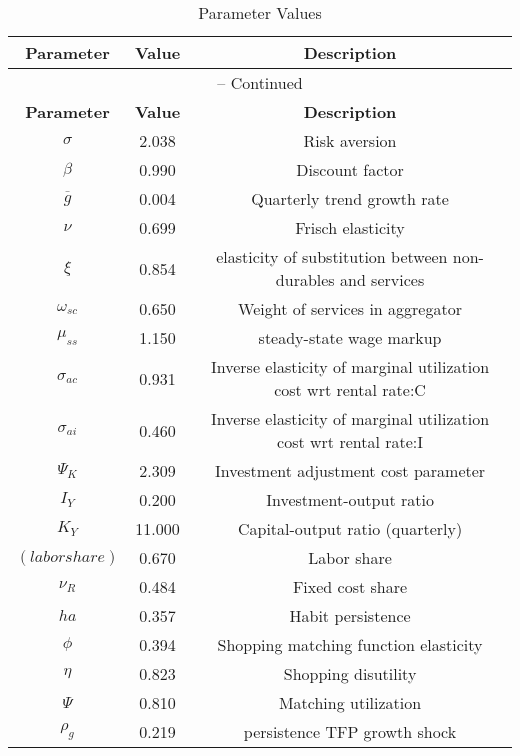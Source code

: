 \begin{center}
\begin{longtable}{ccc}
\caption{Parameter Values}\\%
\toprule%
\multicolumn{1}{c}{\textbf{Parameter}} &
\multicolumn{1}{c}{\textbf{Value}} &
 \multicolumn{1}{c}{\textbf{Description}}\\%
\midrule%
\endfirsthead
\multicolumn{3}{c}{{\tablename} \thetable{} -- Continued}\\%
\midrule%
\multicolumn{1}{c}{\textbf{Parameter}} &
\multicolumn{1}{c}{\textbf{Value}} &
  \multicolumn{1}{c}{\textbf{Description}}\\%
\midrule%
\endhead
${\sigma}$ 	 & 	 2.038 	 & 	 Risk aversion\\
${\beta}$ 	 & 	 0.990 	 & 	 Discount factor\\
${\overline{g}}$ 	 & 	 0.004 	 & 	 Quarterly trend growth rate\\
$\nu$ 	 & 	 0.699 	 & 	 Frisch elasticity\\
$\xi$ 	 & 	 0.854 	 & 	 elasticity of substitution between non-durables and services\\
$\omega_{sc}$ 	 & 	 0.650 	 & 	 Weight of services in aggregator\\
$\mu_{ss}$ 	 & 	 1.150 	 & 	 steady-state wage markup\\
${\sigma_{ac}}$ 	 & 	 0.931 	 & 	 Inverse elasticity of marginal utilization cost wrt rental rate:C\\
${\sigma_{ai}}$ 	 & 	 0.460 	 & 	 Inverse elasticity of marginal utilization cost wrt rental rate:I\\
${\Psi_{K}}$ 	 & 	 2.309 	 & 	 Investment adjustment cost parameter\\
${I_Y}$ 	 & 	 0.200 	 & 	 Investment-output ratio\\
${K_Y}$ 	 & 	 11.000 	 & 	 Capital-output ratio (quarterly)\\
$(labor share)$ 	 & 	 0.670 	 & 	 Labor share\\
${\nu_R}$ 	 & 	 0.484 	 & 	 Fixed cost share\\
${ha}$ 	 & 	 0.357 	 & 	 Habit persistence\\
${\phi}$ 	 & 	 0.394 	 & 	 Shopping matching function elasticity\\
${\eta}$ 	 & 	 0.823 	 & 	 Shopping disutility\\
${\Psi}$ 	 & 	 0.810 	 & 	 Matching utilization\\
${\rho_g}$ 	 & 	 0.219 	 & 	 persistence TFP growth shock\\

\end{longtable}
\end{center}
